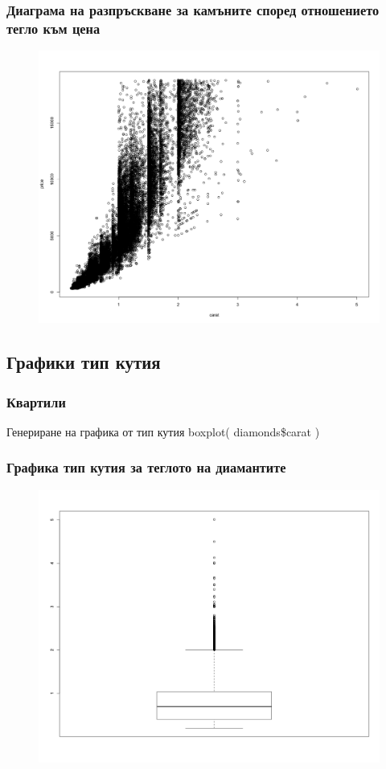 \documentclass{beamer}
\begin{document}
\begin{frame}
\frametitle{Диаграма на разпръскване за камъните според отношението тегло към цена}
\begin{figure}[]\includegraphics[width=\textwidth,height=0.75\textheight]{pic0023}\end{figure}
\end{frame}

\subsection{Графики тип кутия}

\begin{frame}
\frametitle{Квартили}
\begin{block}{Генериране на графика от тип кутия}
boxplot( diamonds\$carat )
\end{block}
\end{frame}

\begin{frame}
\frametitle{Графика тип кутия за теглото на диамантите}
\begin{figure}[]\includegraphics[width=\textwidth,height=0.75\textheight]{pic0024}\end{figure}
\end{frame}
\end{document}
